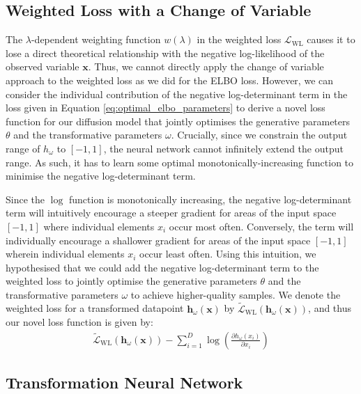 \documentclass[ oneside,%
                    author={George Herbert},
                    degree={MSci},
                     title={Diffusion Models for Time-Evolving Precipitation Fields},
                  subtitle={}]{dissertation}
\begin{document}
\subsection{Weighted Loss with a Change of Variable}

The $\lambda$-dependent weighting function $w(\lambda)$ in the weighted loss $\mathcal{L}_{\mathrm{WL}}$ causes it to lose a direct theoretical relationship with the negative log-likelihood of the observed variable $\mathbf{x}$. Thus, we cannot directly apply the change of variable approach to the weighted loss as we did for the ELBO loss. However, we can consider the individual contribution of the negative log-determinant term in the loss given in Equation \ref{eq:optimal_elbo_parameters} to derive a novel loss function for our diffusion model that jointly optimises the generative parameters $\theta$ and the transformative parameters $\omega$. Crucially, since we constrain the output range of $h_\omega$ to $[-1,1]$, the neural network cannot infinitely extend the output range. As such, it has to learn some optimal monotonically-increasing function to minimise the negative log-determinant term.

Since the $\log$ function is monotonically increasing, the negative log-determinant term will intuitively encourage a steeper gradient for areas of the input space $[-1, 1]$ where individual elements $x_i$ occur most often. Conversely, the term will individually encourage a shallower gradient for areas of the input space $[-1, 1]$ wherein individual elements $x_i$ occur least often. Using this intuition, we hypothesised that we could add the negative log-determinant term to the weighted loss to jointly optimise the generative parameters $\theta$ and the transformative parameters $\omega$ to achieve higher-quality samples. We denote the weighted loss for a transformed datapoint $\mathbf{h}_\omega(\mathbf{x})$ by $\tilde{\mathcal{L}}_{\mathrm{WL}}(\mathbf{h}_\omega(\mathbf{x}))$, and thus our novel loss function is given by:
\begin{align}
      \tilde{\mathcal{L}}_{\mathrm{WL}}(\mathbf{h}_\omega(\mathbf{x})) - \sum_{i=1}^D \log \left(\frac{\partial h_\omega(x_i)}{\partial x_i}\right)\label{eq:weighted_loss_transform}
\end{align}

\subsection{Transformation Neural Network}
\end{document}
